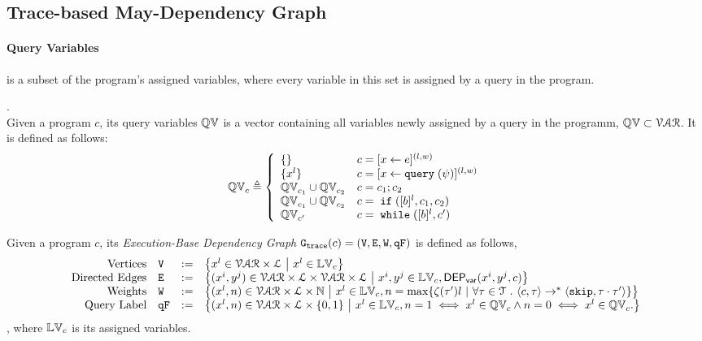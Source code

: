 \subsection{Trace-based May-Dependency Graph}
%
%
%
\paragraph{Query Variables} is a subset of the program's assigned variables, where every variable in this set is assigned by a query in the program.
%
\begin{defn}.
\\
Given a program $c$, its query variables $\mathbb{QV}$ is a vector containing all variables newly assigned by a query in the programm, $\mathbb{QV} \subset \mathcal{VAR}$.
It is defined as follows:
{\footnotesize
$$
  \qvar_{{c}} \triangleq
  \left\{
  \begin{array}{ll}
      \{\}                  
      & {c} = [{\assign x e}]^{(l, w)} 
      \\
      \{{x}^l\}                  
      & {c} = [{\assign x \query(\qexpr)}]^{(l, w)} 
      \\
      \qvar_{{c_1}} \cup \qvar_{{c_2}}  
      & {c} = {c_1};{c_2}
      \\
      \qvar_{{c_1}} \cup \qvar_{{c_2}} 
      & {c} =\eif([\bexpr]^{l}, c_1, c_2) 
      \\
      \qvar_{{c}'}
      & {c}   = \ewhile ([\bexpr]^{l}, {c}')
\end{array}
\right.
$$
}
\end{defn}
%
%
\begin{defn}
\label{def:trace_graph}
Given a program ${c}$,
its \emph{Execution-Base Dependency Graph} $\mathtt{{G_{trace}}}({c}) = (\mathtt{V}, \mathtt{E}, \mathtt{W}, \mathtt{qF})$ is defined as follows,
%
{\footnotesize
\[
\begin{array}{rlcl}
  \text{Vertices} &
  \vertxs & := & \left\{ 
  x^l \in \mathcal{VAR} \times \mathcal{L}
  ~ \middle\vert ~ x^l \in \lvar_{c}
  \right\}
  \\
  \text{Directed Edges} &
  \edges & := & 
  \left\{ 
  (x^i, y^j) \in \mathcal{VAR} \times \mathcal{L} \times \mathcal{VAR} \times \mathcal{L}
  ~ \middle\vert ~
  x^i, y^j \in \lvar_{{c}}, \vardep(x^i, y^j, c)
  
  \right\}
  \\
  \text{Weights} &
  \weights & := & 
  \left\{ 
  (x^l, n) \in \mathcal{VAR} \times \mathcal{L} \times \mathbb{N}
  ~ \middle\vert ~ 
  x^l \in \lvar_{c},
  n = \max \left\{ \vcounter(\vtrace') l ~ \middle\vert~
  \forall \vtrace \in \mathcal{T} \st \config{{c}, \trace} \to^{*} \config{\eskip, \trace\cdot\vtrace'} 
   \right\}
  \right\}
  \\
  \text{Query Label} &
\qflag & := & 
\left\{(x^l, n)  \in  \mathcal{VAR} \times \mathcal{L} \times \{0, 1\} 
~ \middle\vert ~
 x^l \in \lvar_{c},
n = 1 \iff x^l \in \qvar_{c} \land n = 0 \iff  x^l \in \qvar_{c} .
\right\}
\end{array}
\]
}
, where $\mathbb{LV}_c$ is its assigned variables.
\end{defn}
